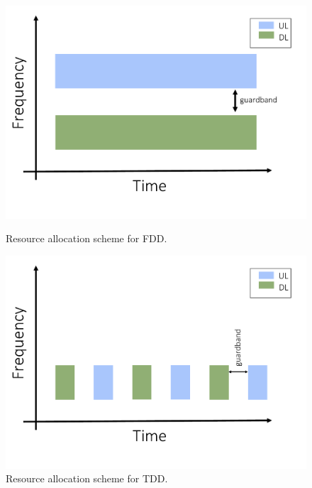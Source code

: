 \begin{figure}[!h]
  \centering
  \begin{minipage}[b]{0.45\textwidth}
      \includegraphics[width=\textwidth]{../images/FDDResourceAllocation.pdf}
    \caption{Resource allocation scheme for \gls{FDD}.}
    \label{fig:FDD}
  \end{minipage}
\hspace*{\fill}
  \begin{minipage}[b]{0.45\textwidth}
    \includegraphics[width=\textwidth]{../images/TDDResourceAllocation.pdf}
    \caption{Resource allocation scheme for \gls{TDD}.}
    \label{fig:TDD}
  \end{minipage}
\end{figure}



